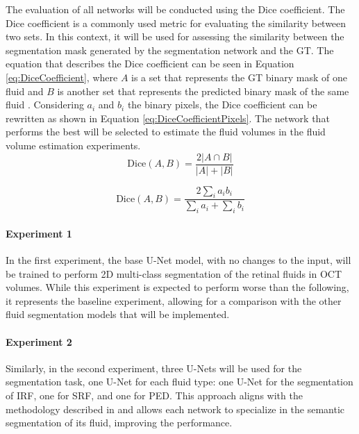 \par
The evaluation of all networks will be conducted using the Dice coefficient. The Dice coefficient is a commonly used metric for evaluating the similarity between two sets. In this context, it will be used for assessing the similarity between the segmentation mask generated by the segmentation network and the GT. The equation that describes the Dice coefficient can be seen in Equation \ref{eq:DiceCoefficient}, where $A$ is a set that represents the GT binary mask of one fluid and $B$ is another set that represents the predicted binary mask of the same fluid \cite{Shamir2019}. Considering $a_{i}$ and $b_{i}$ the binary pixels, the Dice coefficient can be rewritten as shown in Equation \ref{eq:DiceCoefficientPixels}. The network that performs the best will be selected to estimate the fluid volumes in the fluid volume estimation experiments.
\begin{equation}
	\text{Dice}(A, B) = \frac{2|A \cap B|}{|A| + |B|}
	\label{eq:DiceCoefficient}
\end{equation}

\begin{equation}
	\text{Dice}(A, B) = \frac{2\sum_{i} a_{i} b_{i}}{\sum_{i} a_{i} + \sum_{i} b_{i}}
	\label{eq:DiceCoefficientPixels}
\end{equation}

\paragraph{Experiment 1}
In the first experiment, the base U-Net model, with no changes to the input, will be trained to perform 2D multi-class segmentation of the retinal fluids in OCT volumes. While this experiment is expected to perform worse than the following, it represents the baseline experiment, allowing for a comparison with the other fluid segmentation models that will be implemented.

\paragraph{Experiment 2}\label{Experiment2}
Similarly, in the second experiment, three U-Nets will be used for the segmentation task, one U-Net for each fluid type: one U-Net for the segmentation of IRF, one for SRF, and one for PED. This approach aligns with the methodology described in \textcite{Rahil2023, Padilla2022} and allows each network to specialize in the semantic segmentation of its fluid, improving the performance.

